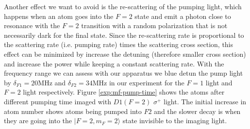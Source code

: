 Another effect we want to avoid is the re-scattering of the pumping light, which happens when an atom goes into the $F=2$ state and emit a photon close to resonance with the $F=2$ transition with a random polarization that is not necessarily dark for the final state. Since the re-scattering rate is proportional to the scattering rate (i.e. pumping rate) times the scattering cross section, this effect can be minimized by increase the detuning (therefore smaller cross section) and increase the power while keeping a constant scattering rate. With the frequency range we can assess with our apparatus we blue detun the pump light by $\delta_{F1}=20\text{MHz}$ and $\delta_{F2}=34\text{MHz}$ in our experiment for the $F=1$ light and $F=2$ light respectively. Figure \ref{exp:mf-pump-time} shows the atoms after different pumping time imaged with $D1 (F=2)$ $\sigma^+$ light. The initial increase in atom number shows atoms being pumped into $F2$ and the slower decay is when they are going into the $|F=2, m_F=2\rangle$ state invisible to the imaging light.

